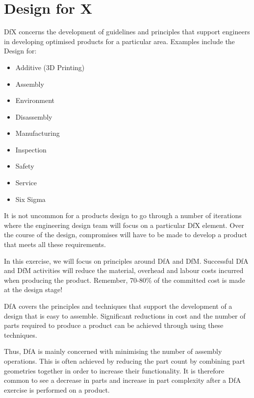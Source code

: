 \section{Design for X}

\acf{DfX} concerns the development of guidelines and principles that support engineers in developing optimised products for a particular area. Examples include the Design for:

\begin{multicols}{2}
  \begin{itemize}
    \item Additive (3D Printing)
    \item Assembly
    \item Environment
    \item Disassembly
    \item Manufacturing
    \item Inspection
    \item Safety
    \item Service
    \item Six Sigma
  \end{itemize}
\end{multicols}


It is not uncommon for a products design to go through a number of iterations where the engineering design team will focus on a particular \ac{DfX} element. Over the course of the design, compromises will have to be made to develop a product that meets all these requirements.

In this exercise, we will focus on principles around \acf{DfA} and \acf{DfM}. Successful \ac{DfA} and \ac{DfM} activities will reduce the material, overhead and labour costs incurred when producing the product. Remember, 70-80\% of the committed cost is made at the design stage!\cite{ullman2002}\cite{corbett1986}\cite{mileham1993}

\acf{DfA} covers the principles and techniques that support the development of a design that is easy to assemble. Significant reductions in cost and the number of parts required to produce a product can be achieved through using these techniques.

Thus, \ac{DfA} is mainly concerned with minimising the number of assembly operations. This is often achieved by reducing the part count by combining part geometries together in order to increase their functionality. It is therefore common to see a decrease in parts and increase in part complexity after a \ac{DfA}  exercise is performed on a product. 

